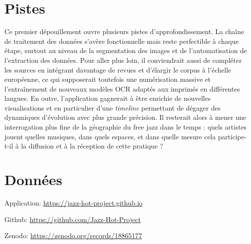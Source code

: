 \documentclass[fra, final]{anthology-ch}      %
\begin{document}
	\section{Pistes}
    Ce premier dépouillement ouvre plusieurs pistes d'approfondissement. La chaîne de traitement des données s'avère fonctionnelle mais reste perfectible à chaque étape, surtout au niveau de la segmentation des images et de l’automatisation de l’extraction des données. Pour aller plus loin, il conviendrait aussi de compléter les sources en intégrant davantage de revues et d'élargir le corpus à l'échelle européenne, ce qui supposerait toutefois une numérisation massive et l'entraînement de nouveaux modèles OCR adaptés aux imprimés en différentes langues.
    En outre, l'application gagnerait à être enrichie de nouvelles visualisations et en particulier d'une \textit{timeline} permettant de dégager des dynamiques d'évolution avec plus grande précision. Il resterait alors à mener une interrogation plus fine de la géographie du free jazz dans le temps : quels artistes jouent quelles musiques, dans quels espaces, et dans quelle mesure cela participe-t-il à la diffusion et à la réception de cette pratique ?

\section*{Données}

Application: \url{https://jazz-hot-project.github.io}

\noindent Github: \url{https://github.com/Jazz-Hot-Project}

\noindent Zenodo: \url{https://zenodo.org/records/18865177}
    
	
	\printbibliography	
	
	
	
\end{document}
